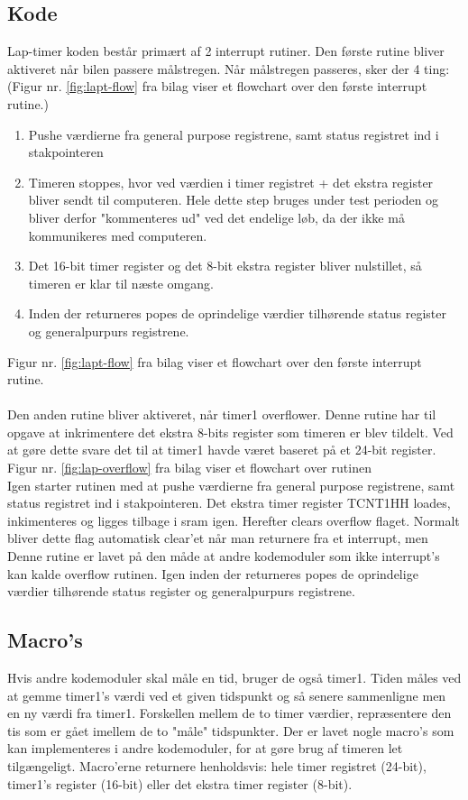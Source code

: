 \subsection{Kode}
Lap-timer koden består primært af 2 interrupt rutiner. Den første rutine bliver aktiveret når bilen passere målstregen. Når målstregen passeres, sker der 4 ting: (Figur nr. \ref{fig:lapt-flow} fra bilag viser et flowchart over den første interrupt rutine.)

\begin{enumerate}
\item Pushe værdierne fra general purpose registrene, samt status registret ind i stakpointeren
\item Timeren stoppes, hvor ved værdien i timer registret + det ekstra register bliver sendt til computeren. Hele dette step bruges under test perioden og bliver derfor "kommenteres ud" ved det endelige løb, da der ikke må kommunikeres med computeren.  
\item Det 16-bit timer register og det 8-bit ekstra register bliver nulstillet, så timeren er klar til næste omgang.
\item Inden der returneres popes de oprindelige værdier tilhørende status register og generalpurpurs registrene.
\end{enumerate}
Figur nr. \ref{fig:lapt-flow} fra bilag viser et flowchart over den første interrupt rutine.\\
\\

Den anden rutine bliver aktiveret, når timer1 overflower. Denne rutine har til opgave at inkrimentere det ekstra 8-bits register som timeren er blev tildelt. Ved at gøre dette svare det til at timer1 havde været baseret på et 24-bit register. Figur nr. \ref{fig:lap-overflow} fra bilag viser et flowchart over rutinen\\ Igen starter rutinen med at pushe værdierne fra general purpose registrene, samt status registret ind i stakpointeren. Det ekstra timer register TCNT1HH loades, inkimenteres og ligges tilbage i sram igen. Herefter clears overflow flaget. Normalt bliver dette flag automatisk clear'et når man returnere fra et interrupt, men Denne rutine er lavet på den måde at andre kodemoduler som ikke interrupt's kan kalde overflow rutinen. Igen inden der returneres popes de oprindelige værdier tilhørende status register og generalpurpurs registrene.

\subsection{Macro's}
Hvis andre kodemoduler skal måle en tid, bruger de også timer1. Tiden måles ved at gemme timer1's værdi ved et given tidspunkt og så senere sammenligne men en ny værdi fra timer1. Forskellen mellem de to timer værdier, repræsentere den tis som er gået imellem de to "måle" tidspunkter.
Der er lavet nogle macro's som kan implementeres i andre kodemoduler, for at gøre brug af timeren let tilgængeligt. Macro'erne returnere henholdsvis: hele timer registret (24-bit), timer1's register (16-bit) eller det ekstra timer register (8-bit). \\
\\
